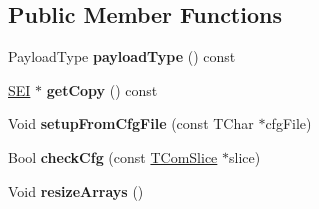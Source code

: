 \subsection*{Public Member Functions}
\begin{DoxyCompactItemize}
\item 
\mbox{\label{class_s_e_i_sub_bitstream_property_adcfb4deafa544aeafb8ba92fb31f6953}} 
Payload\+Type {\bfseries payload\+Type} () const
\item 
\mbox{\label{class_s_e_i_sub_bitstream_property_a742473c741f369ed94ea8e32103116ea}} 
\hyperlink{class_s_e_i}{S\+EI} $\ast$ {\bfseries get\+Copy} () const
\item 
\mbox{\label{class_s_e_i_sub_bitstream_property_aeb550bed86a8e17a284cb7809b4ac10d}} 
Void {\bfseries setup\+From\+Cfg\+File} (const T\+Char $\ast$cfg\+File)
\item 
\mbox{\label{class_s_e_i_sub_bitstream_property_a5be61b24ac6ece2132cfc7b996c09e1a}} 
Bool {\bfseries check\+Cfg} (const \hyperlink{class_t_com_slice}{T\+Com\+Slice} $\ast$slice)
\item 
\mbox{\label{class_s_e_i_sub_bitstream_property_a7adeb0f1c0512a482eee0203a5da237a}} 
Void {\bfseries resize\+Arrays} ()
\end{DoxyCompactItemize}
